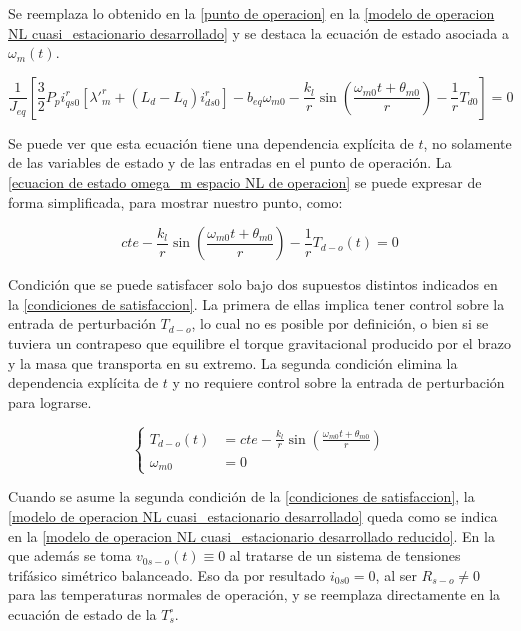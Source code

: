 \documentclass[a4paper, 10pt, onecolumn,journal]{ieeeconf}
\begin{document}
Se reemplaza lo obtenido en la \cref{punto de operacion} en la \cref{modelo de operacion NL cuasi_estacionario desarrollado}
y se destaca la ecuación de estado asociada a $\omega_m(t)$.

\begin{equation}    
    \frac{1}{J_{eq}}\left[\frac{3}{2} P_p i^r_{qs0}\left[\lambda'^r_m + (L_d - L_q) i^r_{ds0} \right] - b_{eq}\omega_{m0} - \frac{k_l}{r}\sin\left(\frac{\omega_{m0}t + \theta_{m0}}{r}\right) - \frac{1}{r}T_{d0}\right] = 0
    \label{ecuacion de estado omega_m espacio NL de operacion}
\end{equation}

Se puede ver que esta ecuación
tiene  una dependencia explícita de $t$, no solamente de las variables de 
estado y de las entradas en el punto de operación. La \cref{ecuacion de estado omega_m espacio NL de operacion}
se puede expresar de forma simplificada, para mostrar nuestro punto, como:

\begin{equation}    
    cte - \frac{k_l}{r}\sin\left(\frac{\omega_{m0}t + \theta_{m0}}{r}\right) - \frac{1}{r}T_{d-o}(t) = 0
    \label{ecuacion de estado omega_m espacio NL de operacion simplificada}
\end{equation}

Condición que se puede satisfacer solo bajo dos supuestos distintos indicados en la \cref{condiciones de satisfaccion}.
La primera de ellas implica tener control sobre la entrada de perturbación $T_{d-o}$, lo cual
no es posible por definición, o bien si se tuviera un contrapeso que equilibre el torque
gravitacional producido por el brazo y la masa que transporta en su extremo. La segunda condición
elimina la dependencia explícita de $t$ y no requiere control sobre la entrada de perturbación para
lograrse.

\begin{equation}
    \begin{cases}
        T_{d-o}(t) &= cte - \frac{k_l}{r}\sin\left(\frac{\omega_{m0}t + \theta_{m0}}{r}\right)\\
        \omega_{m0} &= 0
    \end{cases}
    \label{condiciones de satisfaccion}
\end{equation}

Cuando se asume la segunda condición de la \cref{condiciones de satisfaccion},
la \cref{modelo de operacion NL cuasi_estacionario desarrollado} queda como se indica en la 
\cref{modelo de operacion NL cuasi_estacionario desarrollado reducido}. En la que
además se toma $v_{0s-o}(t) \equiv 0$ al tratarse de un sistema de
tensiones trifásico simétrico balanceado. Eso da por resultado $i_{0s0} = 0$,
al ser $R_{s-o} \neq 0$ para las temperaturas normales de operación, y se reemplaza directamente en la 
ecuación de estado de la $T^{\circ}_{s}$.
\end{document}

